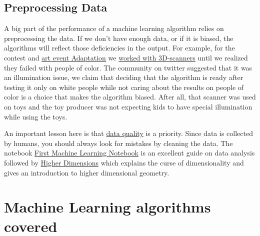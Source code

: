 \documentclass[11pt,letterpaper]{report}
\begin{document}
	\subsection{Preprocessing Data}

	
	 A big part of the performance of a machine learning algorithm relies on preprocessing the data. If we don't have enough data, or if it is biased, the algorithms will reflect those deficiencies in the output. For example, for the contest and 	 \href{	  http://agile-iot.eu/adaptation/}{art event Adaptation}\cite{wadaptation} we 
	 \href{	 https://www.sciartmagazine.com/straight-talk-justus-harris.html}{ worked with 3D-scanners}\cite{wexhibition} 
	  until we realized they failed with people of color. The community on twitter suggested that it was an illumination issue, we claim that deciding that the algorithm is ready after testing it only on white people while not caring about the results on people of color is a choice that makes the algorithm biased. After all, that scanner was used on toys and the toy producer was not expecting kids to have special illumination while using the toys.
	 
	 An important lesson here is that \href{ https://www.quora.com/In-machine-learning-is-more-data-always-better-than-better-algorithms}{data quality}\cite{wdata} is a priority. 
	 Since data is collected by humans, you should always look for mistakes by cleaning the data. The  notebook  \href{ http://nbviewer.jupyter.org/mendozacortesgroup/machine_learning_class/blob/master/Lectures_Jupyter/L2_First_Machine_Learning_Notebook/First\%20Machine\%20Learning\%20Notebook.ipynb}{First Machine Learning Notebook} is an excellent guide on data analysis followed by \href{ http://nbviewer.jupyter.org/mendozacortesgroup/machine_learning_class/blob/master/Lectures_Jupyter/L2_First_Machine_Learning_Notebook/First\%20Machine\%20Learning\%20Notebook.ipynb}{Higher Dimensions} which explains the curse of dimensionality and gives an introduction to higher dimensional geometry. 
	  
 	\section{Machine Learning algorithms covered}
 	
\end{document}
